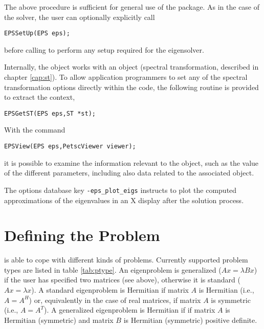 	The above procedure is sufficient for general use of the  package. As in the case of the  solver, the user can optionally explicitly call 
	\begin{Verbatim}[fontsize=\small]
	EPSSetUp(EPS eps);
	\end{Verbatim}
before calling  to perform any setup required for the eigensolver.

	Internally, the  object works with an  object (spectral transformation, described in chapter \ref{cap:st}). To allow application programmers to set any of the spectral transformation options directly within the code, the following routine is provided to extract the  context,
	\begin{Verbatim}[fontsize=\small]
	EPSGetST(EPS eps,ST *st);
	\end{Verbatim}
	
	With the command
	\begin{Verbatim}[fontsize=\small]
	EPSView(EPS eps,PetscViewer viewer);
	\end{Verbatim}
it is possible to examine the information relevant to the  object, such as the value of the different parameters, including also data related to the associated  object.

	The options database key \Verb!-eps_plot_eigs! instructs \slepc to plot the computed approximations of the eigenvalues in an X display after the solution process.

\section{Defining the Problem}
\label{sec:defprob}

	\slepc is able to cope with different kinds of problems. Currently supported problem types are listed in table \ref{tab:ptype}. An eigenproblem is generalized ($Ax=\lambda Bx$) if the user has specified two matrices (see  above), otherwise it is standard ($Ax=\lambda x$). A standard eigenproblem is Hermitian if matrix $A$ is Hermitian (i.e., $A=A^H$) or, equivalently in the case of real matrices, if matrix $A$ is symmetric (i.e., $A=A^T$). A generalized eigenproblem is Hermitian if if matrix $A$ is Hermitian (symmetric) and matrix $B$ is Hermitian (symmetric) positive definite.

